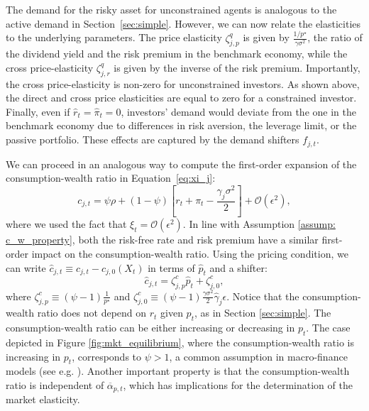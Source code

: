 The demand for the risky asset for unconstrained agents is analogous to the active demand in Section~\ref{sec:simple}. 
However, we can now relate the elasticities to the underlying parameters. 
The price elasticity $\zeta_{j,p}^q$ is given by $\frac{1/p^\star}{\gamma \sigma^2}$, the ratio of the dividend yield and the risk premium in the benchmark economy, while the cross price-elasticity $\zeta_{j,r}^q$ is given by the inverse of the risk premium.  Importantly, the cross price-elasticity is non-zero for unconstrained investors. 
As shown above, the direct and cross price elasticities are equal to zero for a constrained investor. 
Finally, even if $\hat{r}_t = \hat{\pi}_t = 0$, investors' demand would deviate from the one in the benchmark economy due to differences in risk aversion, the leverage limit, or the passive portfolio. 
These effects are captured by the demand shifters $f_{j,t}$.

We can proceed in an analogous way to compute the first-order expansion of the consumption-wealth ratio in Equation~\eqref{eq:xi_j}:
\begin{equation}
    c_{j,t} = \psi \rho + (1-\psi) \left[ r_t + \pi_t  - \frac{\gamma_j \sigma^2}{2}  \right] + \mathcal{O}(\epsilon^2),
\end{equation}
where we used the fact that $\xi_t = \mathcal{O}(\epsilon^2)$. 
In line with Assumption \ref{assump: c_w_property}, both the risk-free rate and risk premium have a similar first-order impact on the consumption-wealth ratio.
Using the pricing condition, we can write $\hat{c}_{j,t} \equiv c_{j,t} - c_{j,0}(X_t)$ in terms of $\hat{p}_t$ and a shifter:
\begin{equation}
    \hat{c}_{j,t} = \zeta^c_{j,p} \hat{p}_t + \zeta^c_{j,0},
\end{equation}
where $\zeta_{j,p}^c \equiv (\psi-1) \frac{1}{p^\star}$ and $\zeta^c_{j,0} \equiv (\psi-1) \frac{\gamma \sigma^2}{2} \hat{\gamma}_j \epsilon$.
Notice that the consumption-wealth ratio does not depend on $r_t$ given $p_t$, as in Section \ref{sec:simple}.
The consumption-wealth ratio can be either increasing or decreasing in $p_t$.
The case depicted in Figure \ref{fig:mkt_equilibrium}, where the consumption-wealth ratio is increasing in $p_t$, corresponds to $\psi > 1$, a common assumption in macro-finance models (see e.g. \citealt{bansal2004risks}).
Another important property is that the consumption-wealth ratio is independent of $\overline{\alpha}_{p,t}$, which has implications for the determination of the market elasticity.

